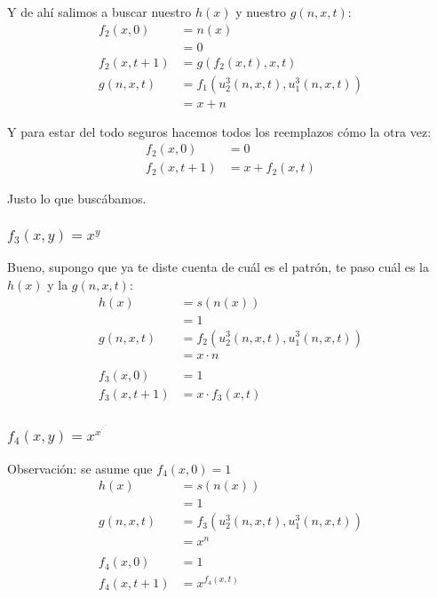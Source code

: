 \documentclass[fleqn, 11pt]{article}
\begin{document}
Y de ahí salimos a buscar nuestro $h(x)$ y nuestro $g(n, x, t)$:
\begin{align*}
	f_2(x, 0)     &= n(x) \\
	&= 0 \\
	f_2(x, t + 1) &= g(f_2(x, t), x, t) \\
	g(n, x, t)     &= f_1(u^3_2(n, x, t), u^3_1(n, x, t)) \\
	&= x + n
\end{align*}

Y para estar del todo seguros hacemos todos los reemplazos cómo la otra vez:
\begin{align*}
	f_2(x, 0)     &= 0 \\
	f_2(x, t + 1) &= x + f_2(x, t)
\end{align*}

Justo lo que buscábamos.

\subsubsection{$f_3(x, y) = x^y$}

Bueno, supongo que ya te diste cuenta de cuál es el patrón, te paso cuál es la
$h(x)$ y la $g(n, x, t)$:
\begin{align*}
	h(x)          &= s(n(x)) \\
	&= 1 \\
	g(n, x, t)    &= f_2(u^3_2(n, x, t), u^3_1(n, x, t)) \\
	&= x \cdot n \\
	\\
	f_3(x, 0)     &= 1 \\
	f_3(x, t + 1) &= x \cdot f_3(x, t)
\end{align*}

\subsubsection{$f_4(x, y) = x^{x^{\cdot^{\cdot^{\cdot^{^{x}}}}}}$}

Observación: se asume que $f_4(x, 0) = 1$
\begin{align*}
	h(x)       &= s(n(x)) \\
	&= 1 \\
	g(n, x, t) &= f_3(u^3_2(n, x, t), u^3_1(n, x, t)) \\
	&= x^n \\
	\\
	f_4(x, 0)     &= 1 \\
	f_4(x, t + 1) &= x^{f_4(x, t)}
\end{align*}
\end{document}
